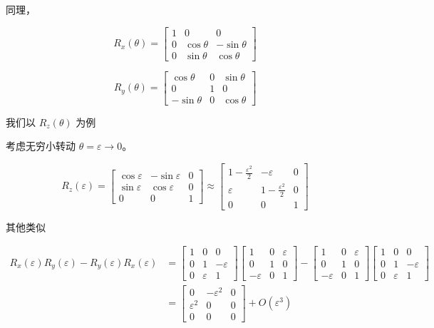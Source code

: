 \documentclass[lang=cn,10pt]{elegantbook}
\begin{document}
同理，

\[
R_x(\theta) = \begin{bmatrix}
	1 & 0 & 0 \\
	0 & \cos\theta & -\sin\theta \\
	0 & \sin\theta & \cos\theta
\end{bmatrix}
\]

\[
R_y(\theta) = \begin{bmatrix}
	\cos\theta & 0 & \sin\theta \\
	0 & 1 & 0 \\
	-\sin\theta & 0 & \cos\theta
\end{bmatrix}
\]

我们以 \( R_{z}(\theta) \) 为例

考虑无穷小转动 \( \theta = \varepsilon \rightarrow 0 \)。

\[
R_z(\varepsilon) = \begin{bmatrix}
	\cos\varepsilon & -\sin\varepsilon & 0 \\
	\sin\varepsilon & \cos\varepsilon & 0 \\
	0 & 0 & 1
\end{bmatrix}
\approx \begin{bmatrix}
	1 - \frac{\varepsilon^2}{2} & -\varepsilon & 0 \\
	\varepsilon & 1 - \frac{\varepsilon^2}{2} & 0 \\
	0 & 0 & 1
\end{bmatrix}
\]

其他类似

\begin{align*}
R_x(\varepsilon) R_y(\varepsilon) - R_y(\varepsilon) R_x(\varepsilon)
&= \begin{bmatrix}
	1 & 0 & 0 \\
	0 & 1 & -\varepsilon \\
	0 & \varepsilon & 1
\end{bmatrix}
\begin{bmatrix}
	1 & 0 & \varepsilon \\
	0 & 1 & 0 \\
	-\varepsilon & 0 & 1
\end{bmatrix}
-
\begin{bmatrix}
	1 & 0 & \varepsilon \\
	0 & 1 & 0 \\
	-\varepsilon & 0 & 1
\end{bmatrix}
\begin{bmatrix}
	1 & 0 & 0 \\
	0 & 1 & -\varepsilon \\
	0 & \varepsilon & 1
\end{bmatrix} \\
&= \begin{bmatrix}
	0 & -\varepsilon^2 & 0 \\
	\varepsilon^2 & 0 & 0 \\
	0 & 0 & 0
\end{bmatrix} + O(\varepsilon^3)
\end{align*}
\end{document}
